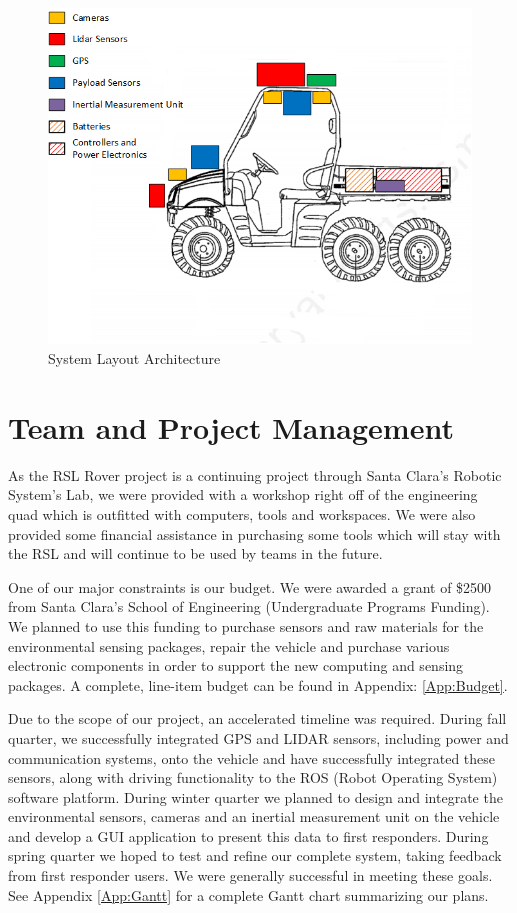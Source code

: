 \begin{figure}[H]
\centering
\includegraphics[width=.7\linewidth]{SensorLayout}
\caption{System Layout Architecture}
\label{fig:systemlayout}
\end{figure}
%
\section{Team and Project Management}

As the RSL Rover project is a continuing project through Santa Clara's Robotic System's Lab, we were provided with a workshop right off of the engineering quad which is outfitted with computers, tools and workspaces. We were also provided some financial assistance in purchasing some tools which will stay with the RSL and will continue to be used by teams in the future. 

One of our major constraints is our budget. We were awarded a grant of \$2500 from Santa Clara's School of Engineering (Undergraduate Programs Funding). We planned to use this funding to purchase sensors and raw materials for the environmental sensing packages, repair the vehicle and purchase various electronic components in order to support the new computing and sensing packages. A complete, line-item budget can be found in Appendix: \ref{App:Budget}. 

Due to the scope of our project, an accelerated timeline was required. During fall quarter, we successfully integrated GPS and LIDAR sensors, including power and communication systems, onto the vehicle and have successfully integrated these sensors, along with driving functionality to the ROS (Robot Operating System) software platform. During winter quarter we planned to design and integrate the environmental sensors, cameras and an inertial measurement unit on the vehicle and develop a GUI application to present this data to first responders. During spring quarter we hoped to test and refine our complete system, taking feedback from first responder users. We were generally successful in meeting these goals. See Appendix \ref{App:Gantt} for a complete Gantt chart summarizing our plans. 

